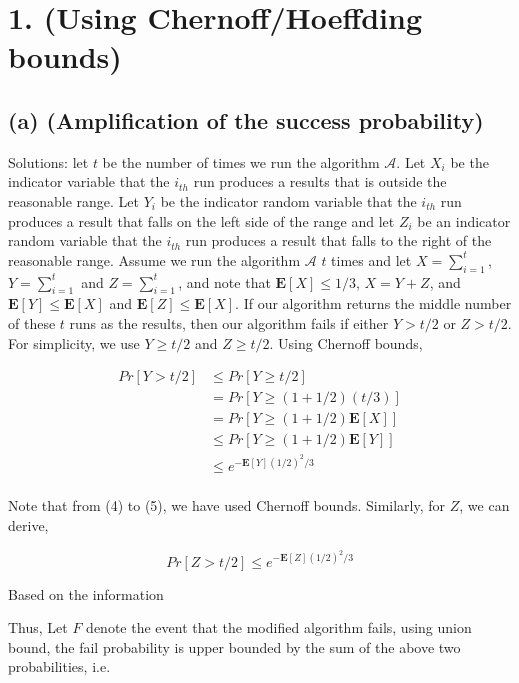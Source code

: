 \documentclass[11pt]{537homework}
\author{Peilun Dai}
\begin{document}
\section*{1. (Using Chernoff/Hoeffding bounds) }



\subsection*{(a) (\textbf{Amplification of the success probability})}

Solutions: let $t$ be the number of times we run the algorithm $\mathcal{A}$. Let $X_i$ be the indicator variable that the $i_{th}$ run produces a results that is outside the reasonable range. Let $Y_i$ be the indicator random variable that the $i_{th}$ run produces a result that falls on the left side of the range and let $Z_i$ be an indicator random variable that the $i_{th}$ run produces a result that falls to the right of the reasonable range. Assume we run the algorithm $\mathcal{A}$ $t$ times and let $X = \sum_{i=1}^t$, $Y = \sum_{i=1}^t$ and $Z = \sum_{i=1}^t$, and note that $\mathbf{E}[X] \leq 1/3$, $X = Y + Z$, and $\mathbf{E}[Y] \leq \mathbf{E}[X]$ and $\mathbf{E}[Z] \leq \mathbf{E}[X]$. If our algorithm returns the middle number of these $t$ runs as the results, then our algorithm fails if either $Y > t/2$ or $Z > t/2$. For simplicity, we use $Y \geq t/2$ and $Z \geq t/2$. Using Chernoff bounds, 

\begin{align}
  Pr[Y > t/2]   & \leq Pr[Y \geq t/2] \\
                & = Pr[Y \geq (1+1/2)(t/3)] \\
                & = Pr[Y \geq (1+1/2)\mathbf{E}[X]] \\
                & \leq Pr[Y \geq (1+1/2)\mathbf{E}[Y]] \\
                & \leq e^{-\mathbf{E}[Y](1/2)^2/3} \\
\end{align}  

Note that from (4) to (5), we have used Chernoff bounds. Similarly, for $Z$, we can derive,

\[
Pr[Z > t/2] \leq e^{-\mathbf{E}[Z](1/2)^2/3}
\]

Based on the information 

Thus, Let $F$ denote the event that the modified algorithm fails, using union bound, the fail probability is upper bounded by the sum of the above two probabilities, i.e.
\end{document}
